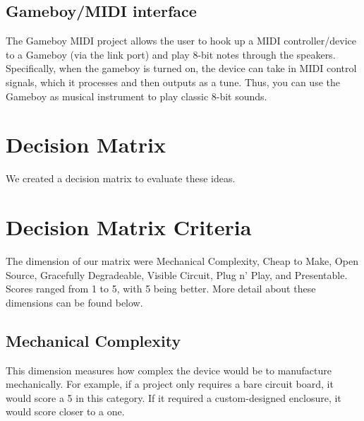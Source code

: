 \documentclass{article}
\begin{document}
\subsection{Gameboy/MIDI interface}

The Gameboy MIDI project allows the user to hook up a MIDI
controller/device to a Gameboy (via the link port) and play 8-bit
notes through the speakers. Specifically, when the gameboy is turned
on, the device can take in MIDI control signals, which it processes
and then outputs as a tune. Thus, you can use the Gameboy as musical
instrument to play classic 8-bit sounds.

\section{Decision Matrix}
We created a decision matrix to evaluate these ideas. 


\section{Decision Matrix Criteria}
The dimension of
our matrix were Mechanical Complexity, Cheap to Make, Open Source,
Gracefully Degradeable, Visible Circuit, Plug n' Play, and
Presentable. Scores ranged from 1 to 5, with 5 being better. More
detail about these dimensions can be found below.
\subsection {Mechanical Complexity}
This dimension measures how complex the device would be to manufacture
mechanically. For example, if a project only requires a bare circuit
board, it would score a 5 in this category. If it required a
custom-designed enclosure, it would score closer to a one. 
\end{document}
